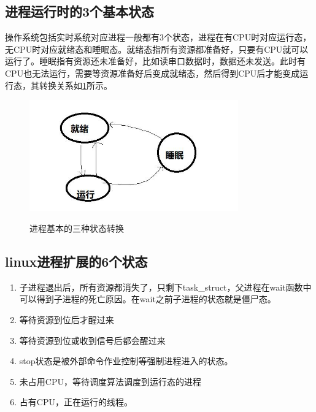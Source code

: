 \subsection{进程运行时的3个基本状态}
操作系统包括实时系统对应进程一般都有3个状态，进程在有CPU时对应运行态，无CPU时对应就绪态和睡眠态。就绪态指所有资源都准备好，只要有CPU就可以运行了。睡眠指有资源还未准备好，比如读串口数据时，数据还未发送。此时有CPU也无法运行，需要等资源准备好后变成就绪态，然后得到CPU后才能变成运行态，其转换关系如\ref{process_3types}所示。

\begin{figure}[H]
 \wdfigbox
  {\caption{进程基本的三种状态转换}\label{process_3types}}
  {
  \includegraphics[width=9cm]{./figure/process_3types.jpg}
  }
\end{figure}

\subsection{linux进程扩展的6个状态}

\begin{enumerate}
  \item {} 子进程退出后，所有资源都消失了，只剩下task\_struct，父进程在wait函数中可以得到子进程的死亡原因。在wait之前子进程的状态就是僵尸态。
  \item {} 等待资源到位后才醒过来
  \item {} 等待资源到位或收到信号后都会醒过来
  \item  {} stop状态是被外部命令作业控制等强制进程进入的状态。
  \item  {} 未占用CPU，等待调度算法调度到运行态的进程
  \item  {} 占有CPU，正在运行的线程。
\end{enumerate}

